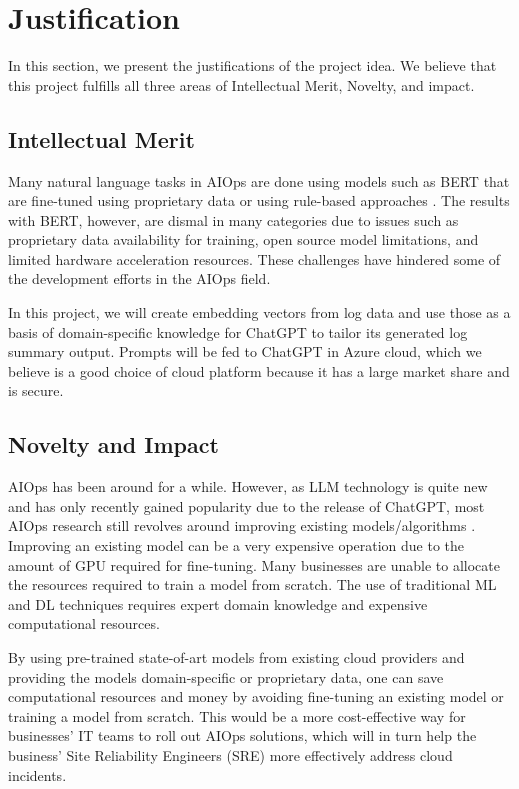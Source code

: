 \documentclass[conference]{IEEEtran}
\begin{document}
\section{Justification}
In this section, we present the justifications of the project idea. We believe that this project fulfills all three areas of Intellectual Merit, Novelty, and impact.

\subsection{Intellectual Merit}
Many natural language tasks in AIOps are done using models such as BERT \cite{network-log-anomaly-detection} that are fine-tuned using proprietary data or using rule-based approaches \cite{logrule}. The results with BERT, however, are dismal \cite{network-log-anomaly-detection} in many categories due to issues such as proprietary data availability for training, open source model limitations, and limited hardware acceleration resources. These challenges have hindered some of the development efforts in the AIOps field.

In this project, we will create embedding vectors from log data and use those as a basis of domain-specific knowledge for ChatGPT to tailor its generated log summary output. Prompts will be fed to ChatGPT in Azure cloud, which we believe is a good choice of cloud platform because it has a large market share and is secure.

\subsection{Novelty and Impact}
AIOps has been around for a while. However, as LLM technology is quite new and has only recently gained popularity due to the release of ChatGPT, most AIOps research still revolves around improving existing models/algorithms \cite{network-log-anomaly-detection}. Improving an existing model can be a very expensive operation due to the amount of GPU required for fine-tuning. Many businesses are unable to allocate the resources required to train a model from scratch. The use of traditional ML and DL techniques requires expert domain knowledge and expensive computational resources.

By using pre-trained state-of-art models from existing cloud providers and providing the models domain-specific or proprietary data, one can save computational resources and money by avoiding fine-tuning an existing model or training a model from scratch. This would be a more cost-effective way for businesses' IT teams to roll out AIOps solutions, which will in turn help the business' Site Reliability Engineers (SRE) more effectively address cloud incidents.
\end{document}
